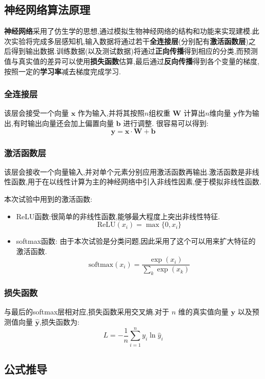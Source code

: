 \subsection{神经网络算法原理}
\textbf{神经网络}采用了仿生学的思想,通过模拟生物神经网络的结构和功能来实现建模.此次实验将完成多层感知机,输入数据将通过若干\textbf{全连接层}(分别配有\textbf{激活函数层})之后得到输出数据.训练数据(以及测试数据)将通过\textbf{正向传播}得到相应的分类,而预测值与真实值的差异可以使用\textbf{损失函数}估算,最后通过\textbf{反向传播}得到各个变量的梯度,按照一定的\textbf{学习率}减去梯度完成学习.

\subsubsection{全连接层}
该层会接受一个向量 $\boldsymbol{x}$ 作为输入,并将其按照$n$组权重 $\boldsymbol{W}$ 计算出$n$维向量 $\boldsymbol{y}$作为输出,有时输出向量还会加上偏置向量 $\boldsymbol{b}$ 进行调整.
很容易可以得到:
$$\boldsymbol{y} = \boldsymbol{x} \cdot \boldsymbol{W} + \boldsymbol{b}$$

\subsubsection{激活函数层}
该层会接收一个向量输入,并对单个元素分别应用激活函数再输出.激活函数是非线性函数,用于在以线性计算为主的神经网络中引入非线性因素,便于模拟非线性函数.

本次试验中用到的激活函数:
\begin{itemize}
    \item ReLU函数:很简单的非线性函数,能够最大程度上突出非线性特征.
    $$ \mathrm{ReLU}(x_i) = \max\{0, x_i\}$$
    \item softmax函数: 由于本次试验是分类问题,因此采用了这个可以用来扩大特征的激活函数.
    $$ \mathrm{softmax}(x_i) = \frac{\exp(x_i)}{\sum_k \exp(x_k)}$$
\end{itemize}

\subsubsection{损失函数}
与最后的softmax层相对应,损失函数采用交叉熵.对于 $n$ 维的真实值向量 $\boldsymbol{y}$ 以及预测值向量 $\boldsymbol{\hat{y}}$,损失函数为:
$$L = -\frac{1}{n} \sum_{i=1}^n y_i \ln \hat{y}_i$$

\subsection{公式推导}

